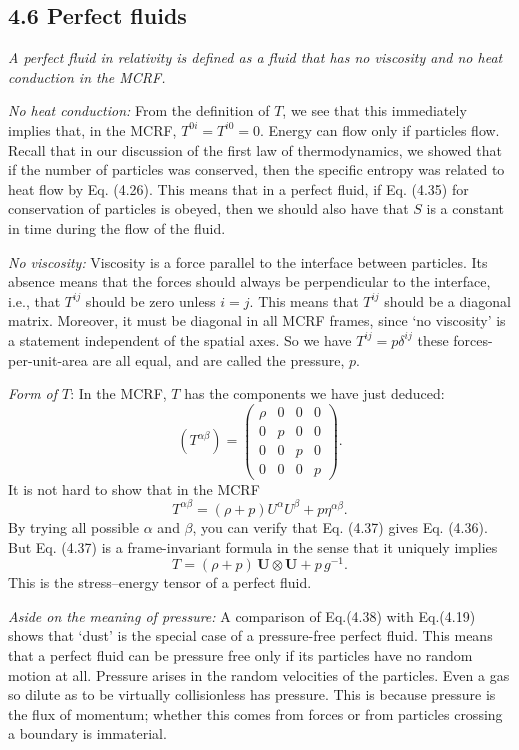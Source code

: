 \documentclass[12pt]{book}
\begin{document}
    \subsection{4.6 Perfect fluids}

    \textit{A perfect fluid in relativity is defined as a fluid that has no viscosity and no heat conduction in the MCRF.}

    \textit{No heat conduction:} From the definition of \(T\), we see that this immediately implies that, in the MCRF, \(T^{0i} = T^{i0} = 0\). Energy can flow only if particles flow. Recall that in our discussion of the first law of thermodynamics, we showed that if the number of particles was conserved, then the specific entropy was related to heat flow by Eq. (4.26). This means that in a perfect fluid, if Eq. (4.35) for conservation of particles is obeyed, then we should also have that \(S\) is a constant in time during the flow of the fluid.

    \textit{No viscosity:} Viscosity is a force parallel to the interface between particles. Its absence means that the forces should always be perpendicular to the interface, i.e., that \(T^{ij}\) should be zero unless \(i = j\). This means that \(T^{ij}\) should be a diagonal matrix. Moreover, it must be diagonal in all MCRF frames, since ‘no viscosity’ is a statement independent of the spatial axes. So we have \(T^{ij} = p \delta^{ij}\) these forces-per-unit-area are all equal, and are called the pressure, \(p\).

    \textit{Form of  \(T\)}: In the MCRF, \(T\) has the components we have just deduced:
    \[
    (T^{\alpha\beta}) =
    \begin{pmatrix}
    \rho & 0 & 0 & 0 \\
    0 & p & 0 & 0 \\
    0 & 0 & p & 0 \\
    0 & 0 & 0 & p
    \end{pmatrix}.
    \tag{4.36}
    \]
    It is not hard to show that in the MCRF
    \[
    T^{\alpha\beta} = (\rho + p) U^\alpha U^\beta + p \eta^{\alpha\beta}. \tag{4.37}
    \]
    By trying all possible \(\alpha\) and \(\beta\), you can verify that Eq. (4.37) gives Eq. (4.36). But Eq. (4.37) is a frame-invariant formula in the sense that it uniquely implies
    \[
    T = (\rho + p) \, \mathbf{U} \otimes \mathbf{U} + p \, g^{-1}. \tag{4.38}
    \]
    This is the stress–energy tensor of a perfect fluid.

    \textit{Aside on the meaning of pressure:}
    A comparison of Eq.(4.38) with Eq.(4.19) shows that ‘dust’ is the special case of a pressure-free perfect fluid. This means that a perfect fluid can be pressure free only if its particles have no random motion at all. Pressure arises in the random velocities of the particles. Even a gas so dilute as to be virtually collisionless has pressure. This is because pressure is the flux of momentum; whether this comes from forces or from particles crossing a boundary is immaterial.
\end{document}
